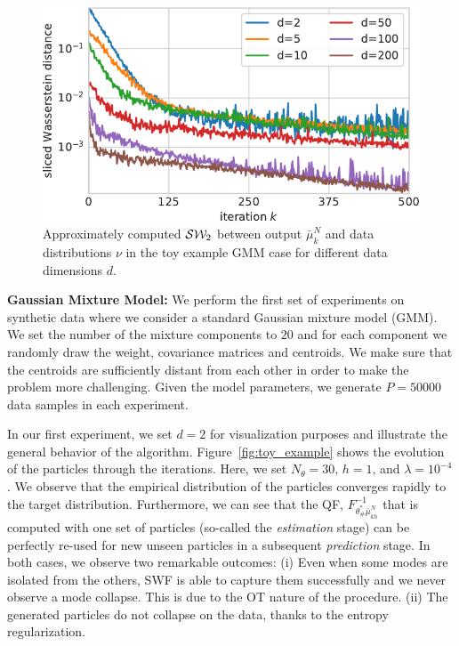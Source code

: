 
\begin{figure}
\vspace{-10pt}
\begin{centering}
\includegraphics[width=0.40\columnwidth]{figures/SW2_cost-crop.pdf}
\par\end{centering}
\caption{Approximately computed ${\cal S}{\cal W}_2$ between output $\bar{\mu}_{k}^{N}$ and data distributions $\nu$ in the toy example GMM case for different data dimensions $d$.
\label{fig:toy_sw}}
\vspace{-10pt}
\end{figure}
\textbf{Gaussian Mixture Model: }
We perform the first set of experiments on synthetic data where we consider a standard Gaussian mixture model (GMM).
%
We set the number of the mixture components to $20$ and for each component we randomly draw the weight, covariance matrices and centroids. We make sure that the centroids are sufficiently distant from each other in order to make the problem more challenging. Given the model parameters, we generate $P=50000$ data samples in each experiment.


In our first experiment, we set $d=2$ for visualization purposes and illustrate the general behavior of the algorithm. Figure~\ref{fig:toy_example} shows the evolution of the particles through the iterations. Here, we set $N_\theta=30$, $h=1$, and $\lambda=10^{-4}$.
%
We observe that the empirical distribution of the particles converges rapidly to the target distribution. Furthermore, we can see that the QF, $F^{-1}_{\theta^*_\#\bar{\mu}_{kh}^{N}}$ that is computed with one set of particles (so-called the \textit{estimation} stage) can be perfectly re-used for new unseen particles in a subsequent \textit{prediction} stage. In both cases, we observe two remarkable outcomes: (i) Even when some modes are isolated from the others, SWF is able to capture them successfully and we never observe a mode collapse. This is due to the OT nature of the procedure. (ii) The generated particles do not collapse on the data, thanks to the entropy regularization.

